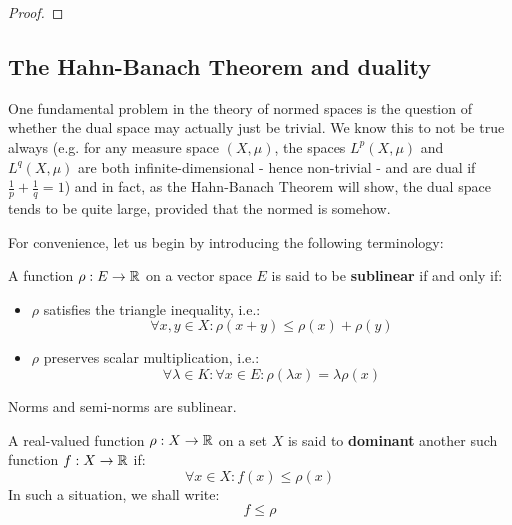         \begin{theorem} \label{theorem: closed_graph}
            
        \end{theorem}
            \begin{proof}
                
            \end{proof}

    \subsection{The Hahn-Banach Theorem and duality}
        One fundamental problem in the theory of normed spaces is the question of whether the dual space may actually just be trivial. We know this to not be true always (e.g. for any measure space $(X, \mu)$, the spaces $L^p(X, \mu)$ and $L^q(X, \mu)$ are both infinite-dimensional - hence non-trivial - and are dual if $\frac1p + \frac1q = 1$) and in fact, as the Hahn-Banach Theorem will show, the dual space tends to be quite large, provided that the normed is  somehow.

        For convenience, let us begin by introducing the following terminology:
        \begin{definition}[Sublinearity] \label{def: sublinearity}
            A function $\rho: E \to \mathbb{R}$ on a vector space $E$ is said to be \textbf{sublinear} if and only if:
            \begin{itemize}
                \item $\rho$ satisfies the triangle inequality, i.e.:
                    $$\forall x, y \in X: \rho(x + y) \leq \rho(x) + \rho(y)$$
                \item $\rho$ preserves scalar multiplication, i.e.:
                    $$\forall \lambda \in K: \forall x \in E: \rho(\lambda x) = \lambda \rho(x)$$
            \end{itemize}
        \end{definition}
        \begin{example}
            Norms and semi-norms are sublinear. 
        \end{example}
        \begin{definition}[Dominance] \label{def: dominance}
            A real-valued function $\rho: X \to \mathbb{R}$ on a set $X$ is said to \textbf{dominant} another such function $f: X \to \mathbb{R}$ if:
                $$\forall x \in X: f(x) \leq \rho(x)$$
            In such a situation, we shall write:
                $$f \leq \rho$$
        \end{definition}

